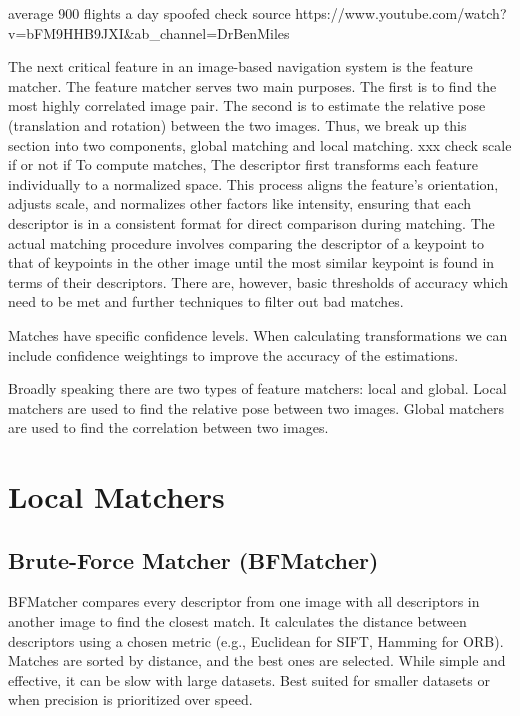 average 900 flights a day spoofed check source
https://www.youtube.com/watch?v=bFM9HHB9JXI&ab_channel=DrBenMiles





The next critical feature in an image-based navigation system is the feature matcher. The feature matcher serves two main purposes. The first is to find the most highly correlated image pair. The second is to estimate the relative pose (translation and rotation) between the two images. Thus, we break up this section into two components, global matching and local matching. 
xxx check scale if or not if
To compute matches, The descriptor first transforms each feature individually to a normalized space. This process aligns the feature’s orientation, adjusts scale, and normalizes other factors like intensity, ensuring that each descriptor is in a consistent format for direct comparison during matching. The actual matching procedure involves comparing the descriptor of a keypoint to that of keypoints in the other image until the most similar keypoint is found in terms of their descriptors. There are, however, basic thresholds of accuracy which need to be met and further techniques to filter out bad matches. 


Matches have specific confidence levels. When calculating transformations we can include confidence weightings to improve the accuracy of the estimations. 

Broadly speaking there are two types of feature matchers: local and global. Local matchers are used to find the relative pose between two images. Global matchers are used to find the correlation between two images.

\section*{Local Matchers}
\subsection*{Brute-Force Matcher (BFMatcher)} BFMatcher compares every descriptor from one image with all descriptors in another image to find the closest match. It calculates the distance between descriptors using a chosen metric (e.g., Euclidean for SIFT, Hamming for ORB). Matches are sorted by distance, and the best ones are selected. While simple and effective, it can be slow with large datasets. Best suited for smaller datasets or when precision is prioritized over speed.

